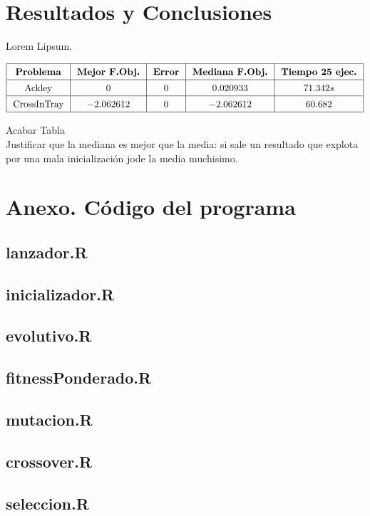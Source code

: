 \documentclass{article}
\begin{document}
\section{Resultados y Conclusiones}
Lorem Lipsum.

\[\arraycolsep=7pt\def\arraystretch{1.4}
\begin{array}{|c|c|c|c|c|}
\hline
\text{\textbf{Problema}} & \text{\textbf{Mejor F.Obj.}} & \text{\textbf{Error}} & \text{\textbf{Mediana F.Obj.}} & \text{\textbf{Tiempo 25 ejec.}} \\ \hline
\text{Ackley} & 0 & 0 & 0.020933 & 71.342s \\ \hline
\text{CrossInTray} & -2.062612 & 0 & -2.062612 & 60.682 \\ \hline
\end{array}\]

Acabar Tabla \\
Justificar que la mediana es mejor que la media: si sale un resultado que explota por una mala inicialización jode la media muchisimo.

\vspace{5cm}

{}


\newpage

\section{Anexo. Código del programa} 

\subsection{lanzador.R}

\subsection{inicializador.R}

\subsection{evolutivo.R}

\subsection{fitnessPonderado.R}

\subsection{mutacion.R}

\subsection{crossover.R}

\subsection{seleccion.R}

\end{document}
